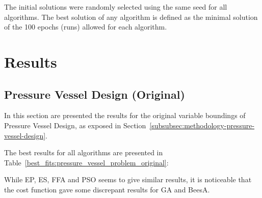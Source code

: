 \documentclass[conference]{IEEEtran}
\begin{document}
The initial solutions were randomly selected using the same seed for all algorithms.
The best solution of any algorithm is defined as the minimal solution of the 100 epochs (runs)
allowed for each algorithm.

\section{Results}
\label{sec:results}
\subsection{Pressure Vessel Design (Original)}
\label{subsec:pressure_vessel_problem_original}

In this section are presented the results for the original variable boundings of Pressure Vessel Design,
as exposed in Section~\ref{subsubsec:methodology-pressure-vessel-design}.

The best results for all algorithms are presented in Table~\ref{best_fits:pressure_vessel_problem_original}:

\begin{table}[H]
\centering
\caption{Best Fits for Pressure Vessel Design (Original)}
\label{best_fits:pressure_vessel_problem_original}
\end{table}

While EP, ES, FFA and PSO seems to give similar results, it is noticeable that the cost function
gave some discrepant results for GA and BeesA.
\end{document}
